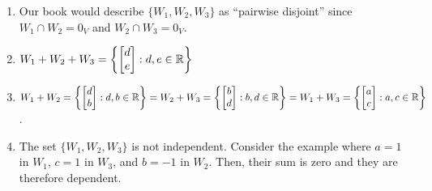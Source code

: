 \smallskip
\begin{solution}
\begin{enumerate} 
  \item Our book would describe $\{W_1, W_2, W_3\}$ as ``pairwise disjoint'' since $W_1 \cap W_2 = 0_V$ and $W_2 \cap W_3 = 0_V$.
  \item $W_1 + W_2 + W_3 =  \left\{\begin{bmatrix}  d \\ e\end{bmatrix} : d,e \in \mathbb{R} \right\}$
  \item $W_1 + W_2 = \left\{\begin{bmatrix}  d \\ b\end{bmatrix} : d,b \in \mathbb{R} \right\} = W_2 + W_3 = \left\{\begin{bmatrix}  b \\ d\end{bmatrix} : b,d \in \mathbb{R} \right\} = W_1 + W_3 = \left\{\begin{bmatrix}  a \\ c\end{bmatrix} : a,c \in \mathbb{R} \right\}$.
  \item The set $\{W_1, W_2, W_3\}$ is not independent. Consider the example where $a=1$ in $W_1$, $c=1$ in $W_3$, and $b=-1$ in $W_2$. Then, their sum is zero and they are therefore dependent. 
\end{enumerate}
\end{solution}

\probskip


